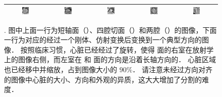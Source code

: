 \begin{figure}
\begin{center}
\begin{tabular}{ccccc}
\includegraphics[width=0.19\textwidth]{./data/ohm/control/HCMNet_1100594/00_SAX/35_/im_t.png} &
\includegraphics[width=0.19\textwidth]{./data/ohm/control/HCMNet_1100823/00_SAX/33_/im_t.png} &
\includegraphics[width=0.19\textwidth]{./data/ohm/control/HCMNet_2600035/00_SAX/024_SA_CINE/im_t.png} &
\includegraphics[width=0.19\textwidth]{./data/ohm/control/HCMNet_1700012/01_HLA/00/im_t.png} &
\includegraphics[width=0.19\textwidth]{./data/ohm/control/HCMNet_2100096/02_VLA/00/im_t.png} \\
\bottomrule

\end{tabular}

\caption[\captiontitle]{\captiontitle{}.
图中上面一行为短轴面（\SA{}）、四腔切面（\HLA{}）和两腔（\VLA{}）的图像，下面一行为对应的经过一个刚体、仿射变换后变换到一个典型方向的图像．
按照临床习惯，心脏已经经过了旋转，使得 \SA{} 面的右室在放射学上的图像右侧，而左室在 \HLA{} 和 \VLA{} 面的方向是沿着长轴方向的．
心脏区域也已经移中并缩放，占到图像大小的 $90\%$．
请注意未经过方向对齐的图像中心脏的大小、方向和外观的异质，这大大增加了分割的难度．
}
\label{fig:canonical-orientation}
\end{center}
\end{figure}
